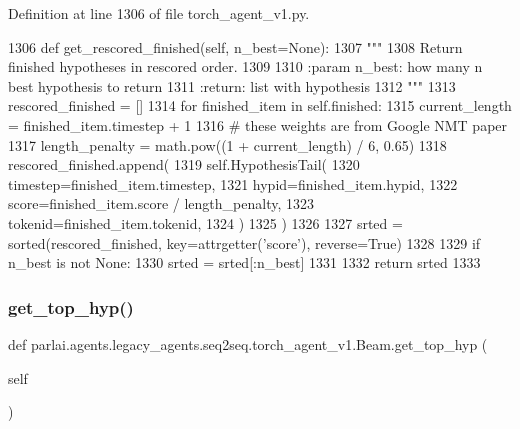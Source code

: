 Definition at line 1306 of file torch\+\_\+agent\+\_\+v1.\+py.


\begin{DoxyCode}
1306     \textcolor{keyword}{def }get\_rescored\_finished(self, n\_best=None):
1307         \textcolor{stringliteral}{"""}
1308 \textcolor{stringliteral}{        Return finished hypotheses in rescored order.}
1309 \textcolor{stringliteral}{}
1310 \textcolor{stringliteral}{        :param n\_best: how many n best hypothesis to return}
1311 \textcolor{stringliteral}{        :return: list with hypothesis}
1312 \textcolor{stringliteral}{        """}
1313         rescored\_finished = []
1314         \textcolor{keywordflow}{for} finished\_item \textcolor{keywordflow}{in} self.finished:
1315             current\_length = finished\_item.timestep + 1
1316             \textcolor{comment}{# these weights are from Google NMT paper}
1317             length\_penalty = math.pow((1 + current\_length) / 6, 0.65)
1318             rescored\_finished.append(
1319                 self.HypothesisTail(
1320                     timestep=finished\_item.timestep,
1321                     hypid=finished\_item.hypid,
1322                     score=finished\_item.score / length\_penalty,
1323                     tokenid=finished\_item.tokenid,
1324                 )
1325             )
1326 
1327         srted = sorted(rescored\_finished, key=attrgetter(\textcolor{stringliteral}{'score'}), reverse=\textcolor{keyword}{True})
1328 
1329         \textcolor{keywordflow}{if} n\_best \textcolor{keywordflow}{is} \textcolor{keywordflow}{not} \textcolor{keywordtype}{None}:
1330             srted = srted[:n\_best]
1331 
1332         \textcolor{keywordflow}{return} srted
1333 
\end{DoxyCode}
\mbox{\label{classparlai_1_1agents_1_1legacy__agents_1_1seq2seq_1_1torch__agent__v1_1_1Beam_abd7ea96a6f890297fc526e31e143a018}} 
\subsubsection{\texorpdfstring{get\+\_\+top\+\_\+hyp()}{get\_top\_hyp()}}
{\footnotesize\ttfamily def parlai.\+agents.\+legacy\+\_\+agents.\+seq2seq.\+torch\+\_\+agent\+\_\+v1.\+Beam.\+get\+\_\+top\+\_\+hyp (\begin{DoxyParamCaption}\item[{}]{self }\end{DoxyParamCaption})}

